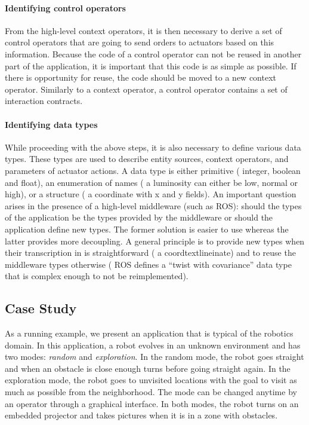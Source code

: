 \paragraph*{Identifying control operators}
From the high-level context operators, it is then necessary to derive
a set of control operators that are going to send orders to actuators
based on this information. Because the code of a control operator can
not be reused in another part of the application, it is important that
this code is as simple as possible. If there is opportunity for reuse,
the code should be moved to a new context operator. Similarly to a
context operator, a control operator contains a set of interaction
contracts.

\paragraph*{Identifying data types}
While proceeding with the above steps, it is also necessary to define
various data types. These types are used to describe entity sources,
context operators, and parameters of actuator actions. A data type is
either primitive (\eg{} integer, boolean and float), an enumeration of
names (\eg{} a luminosity can either be low, normal or high), or a
structure (\eg{} a coordinate with x and y fields). An important
question arises in the presence of a high-level middleware
(such as ROS): should the types of the application be the types
provided by the middleware or should the application define
new types. The former solution is easier to use whereas the latter
provides more decoupling. A general principle is to provide new types
when their transcription in \diaspec{} is straightforward (\eg{} a
coordtextlineinate) and to reuse the middleware types otherwise (\eg{}
ROS defines a ``twist with covariance'' data type that is complex
enough to not be reimplemented).

\subsection{Case Study}

As a running example, we present an application that is typical of the
robotics domain. In this application, a robot evolves in an unknown
environment and has two modes: \emph{random} and \emph{exploration}.
In the random mode, the robot goes straight and when an obstacle is
close enough turns before going straight again. In the exploration
mode, the robot goes to unvisited locations with the goal to visit as
much as possible from the neighborhood. The mode can be changed
anytime by an operator through a graphical interface. In both modes,
the robot turns on an embedded projector and takes pictures when it is
in a zone with obstacles.

